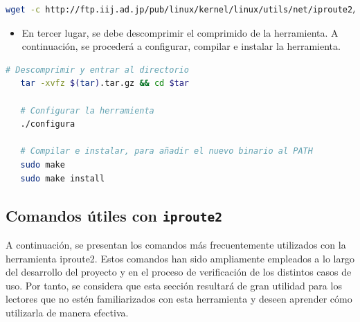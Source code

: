 \begin{lstlisting}[language= bash, style=Consola, caption={Obtención del source de Iproute2},label=code:iproute2_src]
   wget -c http://ftp.iij.ad.jp/pub/linux/kernel/linux/utils/net/iproute2/iproute2-4.15.0.tar.gz
\end{lstlisting}

\begin{itemize}
    \item En tercer lugar, se debe descomprimir el comprimido de la herramienta. A continuación, se procederá a configurar, compilar e instalar la herramienta.
\end{itemize}

\begin{lstlisting}[language= bash, style=Consola, caption={Compilación e instalación de Iproute2},label=code:iproute2_install]
   # Descomprimir y entrar al directorio
   tar -xvfz $(tar).tar.gz && cd $tar
   
   # Configurar la herramienta
   ./configura
   
   # Compilar e instalar, para añadir el nuevo binario al PATH
   sudo make
   sudo make install
\end{lstlisting}

\newpage

\subsection{Comandos útiles con \texttt{iproute2}}

A continuación, se presentan los comandos más frecuentemente utilizados con la herramienta iproute2. Estos comandos han sido ampliamente empleados a lo largo del desarrollo del proyecto y en el proceso de verificación de los distintos casos de uso. Por tanto, se considera que esta sección resultará de gran utilidad para los lectores que no estén familiarizados con esta herramienta y deseen aprender cómo utilizarla de manera efectiva.\\

